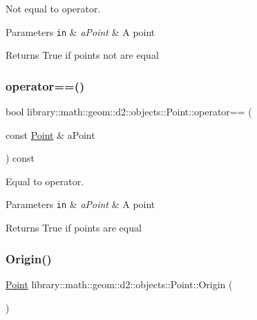 Not equal to operator. 


\begin{DoxyParams}[1]{Parameters}
\mbox{\tt in}  & {\em a\+Point} & A point \\
\hline
\end{DoxyParams}
\begin{DoxyReturn}{Returns}
True if points not are equal 
\end{DoxyReturn}
\mbox{\label{classlibrary_1_1math_1_1geom_1_1d2_1_1objects_1_1_point_af5223d8e73deaf75ac248a5d43139628}} 
\subsubsection{\texorpdfstring{operator==()}{operator==()}}
{\footnotesize\ttfamily bool library\+::math\+::geom\+::d2\+::objects\+::\+Point\+::operator== (\begin{DoxyParamCaption}\item[{const \hyperlink{classlibrary_1_1math_1_1geom_1_1d2_1_1objects_1_1_point}{Point} \&}]{a\+Point }\end{DoxyParamCaption}) const}



Equal to operator. 


\begin{DoxyParams}[1]{Parameters}
\mbox{\tt in}  & {\em a\+Point} & A point \\
\hline
\end{DoxyParams}
\begin{DoxyReturn}{Returns}
True if points are equal 
\end{DoxyReturn}
\mbox{\label{classlibrary_1_1math_1_1geom_1_1d2_1_1objects_1_1_point_ac372ec5b87ab91d58dc515eda2f0fa75}} 
\subsubsection{\texorpdfstring{Origin()}{Origin()}}
{\footnotesize\ttfamily \hyperlink{classlibrary_1_1math_1_1geom_1_1d2_1_1objects_1_1_point}{Point} library\+::math\+::geom\+::d2\+::objects\+::\+Point\+::\+Origin (\begin{DoxyParamCaption}{ }\end{DoxyParamCaption})\hspace{0.3cm}{\ttfamily [static]}}



